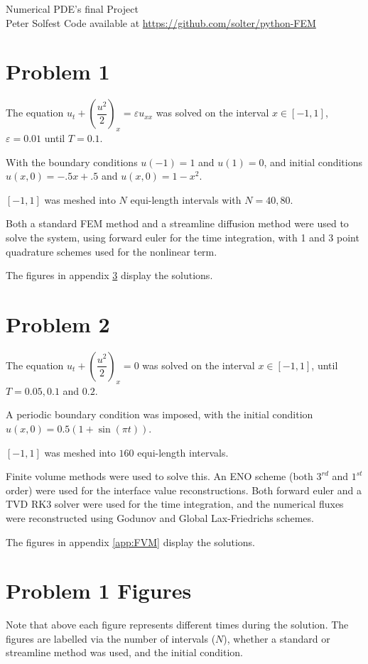 \documentclass[10pt,letterpaper,fleqn]{article}
\begin{document}
\doublespacing

\begin{flushright}
Numerical PDE's final Project\\
Peter Solfest
Code available at \url{https://github.com/solter/python-FEM}
\end{flushright}


\section{Problem 1}
The equation $u_t + \left(\dfrac{u^2}{2}\right)_x = \varepsilon u_{xx}$ was solved on the interval $x \in [-1,1]$, $\varepsilon = 0.01$ until $T = 0.1$.

With the boundary conditions $u(-1) = 1$ and $u(1) = 0$, and initial conditions $u(x,0) = -.5x + .5$ and $u(x,0) = 1 - x^2$.

$[-1,1]$ was meshed into $N$ equi-length intervals with $N = 40,80$.

Both a standard FEM method and a streamline diffusion method were used
to solve the system, using forward euler for the time integration,
with 1 and 3 point quadrature schemes used for the nonlinear term.

The figures in appendix \ref{app:FEM} display the solutions.

\section{Problem 2}
The equation $u_t + \left(\dfrac{u^2}{2}\right)_x = 0$ was solved on the interval $x \in [-1,1]$, until $T = 0.05, 0.1$ and $0.2$.

A periodic boundary condition was imposed, with the initial condition
$u(x,0) = 0.5 (1 + \sin(\pi t))$.

$[-1,1]$ was meshed into $160$ equi-length intervals.

Finite volume methods were used to solve this.
An ENO scheme (both $3^{rd}$ and $1^{st}$ order) were used for
the interface value reconstructions.
Both forward euler and a TVD RK3 solver were used for the time integration,
and the numerical fluxes were reconstructed using Godunov and Global Lax-Friedrichs schemes.

The figures in appendix \ref{app:FVM} display the solutions.


\appendix
\section{Problem 1 Figures}\label{app:FEM}
Note that above each figure represents different times during the solution.
The figures are labelled via the number of intervals ($N$),
whether a standard or streamline method was used, and the initial condition.
\end{document}
